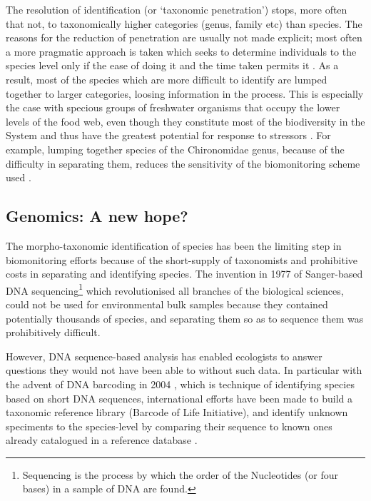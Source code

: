 The resolution of identification (or `taxonomic penetration') stops, more often that not, to taxonomically higher categories (genus, family etc) than species. The reasons for the reduction of penetration are usually not made explicit; most often a more pragmatic approach is taken which seeks to determine individuals to the species level only if the ease of doing it and the time taken permits it \cite{cranston_biomonitoring_1990}. As a result, most of the species which are more difficult to identify are lumped together to larger categories, loosing information in the process. This is especially the case with specious groups of freshwater organisms that occupy the lower levels of the food web, even though they constitute most of the biodiversity in the System and thus have the greatest potential for response to stressors \cite{woodward_biomonitoring_21st}. For example, lumping together species of the Chironomidae genus, because of the difficulty in separating them, reduces the sensitivity of the biomonitoring scheme used \cite{ruse_classification_2010}.



\subsection{Genomics: A new hope?}
The morpho-taxonomic identification of species has been the limiting step in biomonitoring efforts because of the short-supply of taxonomists and prohibitive costs in separating and identifying species. The invention in 1977 of Sanger-based DNA sequencing\footnote{Sequencing is the process by which the order of the Nucleotides (or four bases) in a sample of DNA are found.} which revolutionised all branches of the biological sciences, could not be used for environmental bulk samples because they contained potentially thousands of species, and separating them so as to sequence them was prohibitively difficult. 

However, DNA sequence-based analysis has enabled ecologists to answer questions they would not have been able to without such data. In particular with the advent of DNA barcoding in 2004 \cite{hebert_paul_d._n._biological_2003}, which is technique of identifying species based on short DNA sequences, international efforts have been made to build a taxonomic reference library (Barcode of Life Initiative), and identify unknown speciments to the species-level by comparing their sequence to known ones already catalogued in a reference database \cite{savolainen_vincent_towards_2005}. 

